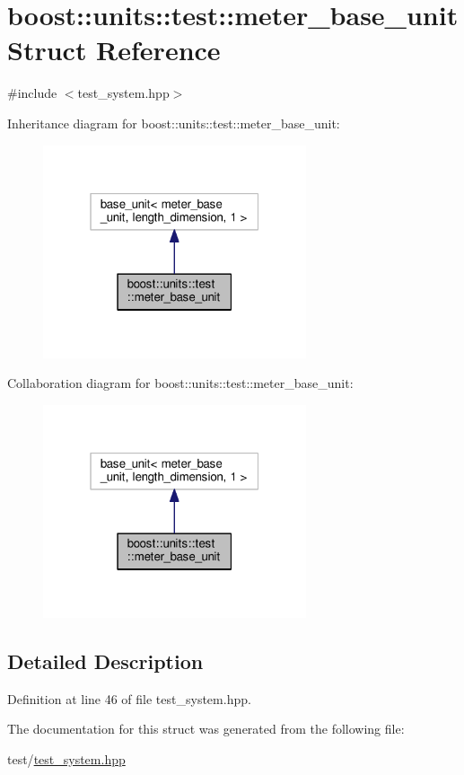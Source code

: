 \hypertarget{structboost_1_1units_1_1test_1_1meter__base__unit}{}\section{boost\+:\+:units\+:\+:test\+:\+:meter\+\_\+base\+\_\+unit Struct Reference}
\label{structboost_1_1units_1_1test_1_1meter__base__unit}


{\ttfamily \#include $<$test\+\_\+system.\+hpp$>$}



Inheritance diagram for boost\+:\+:units\+:\+:test\+:\+:meter\+\_\+base\+\_\+unit\+:\nopagebreak
\begin{figure}[H]
\begin{center}
\leavevmode
\includegraphics[width=220pt]{structboost_1_1units_1_1test_1_1meter__base__unit__inherit__graph}
\end{center}
\end{figure}


Collaboration diagram for boost\+:\+:units\+:\+:test\+:\+:meter\+\_\+base\+\_\+unit\+:\nopagebreak
\begin{figure}[H]
\begin{center}
\leavevmode
\includegraphics[width=220pt]{structboost_1_1units_1_1test_1_1meter__base__unit__coll__graph}
\end{center}
\end{figure}


\subsection{Detailed Description}


Definition at line 46 of file test\+\_\+system.\+hpp.



The documentation for this struct was generated from the following file\+:\begin{DoxyCompactItemize}
\item 
test/\hyperlink{test__system_8hpp}{test\+\_\+system.\+hpp}\end{DoxyCompactItemize}
